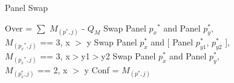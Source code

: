 \documentclass{article}
\begin{document}
\begin{algorithm}
\caption{Panel Swap}
\LinesNumbered
{}
Over = $\sum$  $M_{(p^*, j)}$ - $Q_M$ \;
    {
      {
        {Swap Panel ${p_x}^*$ and Panel $p^*_y$, \\$M_{({p_x}^*, j)}$ == 3, x $>$ y}
           {Swap Panel ${p^*_x}$ and [ Panel $p^*_{y1}$, $p^*_{y2}$ ], \\$M_{({p_x}^*, j)}$ == 3, x$>$y1$>$y2}
              {Swap Panel ${p^*_x}$ and Panel $p^*_y$,\\$M_{({p^*_x}, j)}$ == 2, x $>$ y}
      }
    Conf = $M_{(p^*, j)}$}
\end{algorithm}
\end{document}
